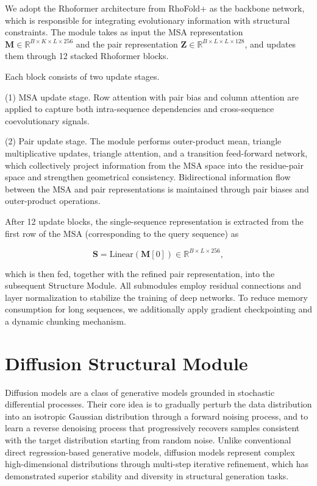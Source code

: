 We adopt the Rhoformer architecture from RhoFold+ as the backbone network\cite{Shen2024RhoFoldPlus}, which is responsible for integrating evolutionary information with structural constraints. The module takes as input the MSA representation $\mathbf{M} \in \mathbb{R}^{B \times K \times L \times 256}$ and the pair representation $\mathbf{Z} \in \mathbb{R}^{B \times L \times L \times 128}$, and updates them through 12 stacked Rhoformer blocks.

  

Each block consists of two update stages.

(1) MSA update stage. Row attention with pair bias and column attention are applied to capture both intra-sequence dependencies and cross-sequence coevolutionary signals.

(2) Pair update stage. The module performs outer-product mean, triangle multiplicative updates, triangle attention, and a transition feed-forward network, which collectively project information from the MSA space into the residue-pair space and strengthen geometrical consistency. Bidirectional information flow between the MSA and pair representations is maintained through pair biases and outer-product operations.

After 12 update blocks, the single-sequence representation is extracted from the first row of the MSA (corresponding to the query sequence) as

$$\mathbf{S} = \text{Linear}(\mathbf{M}[0]) \in \mathbb{R}^{B \times L \times 256},$$

which is then fed, together with the refined pair representation, into the subsequent Structure Module. All submodules employ residual connections and layer normalization to stabilize the training of deep networks. To reduce memory consumption for long sequences, we additionally apply gradient checkpointing and a dynamic chunking mechanism.

\section{Diffusion Structural Module}

Diffusion models are a class of generative models grounded in stochastic differential processes\cite{sohldickstein2015diffusion, ho2020ddpm}. Their core idea is to gradually perturb the data distribution into an isotropic Gaussian distribution through a forward noising process, and to learn a reverse denoising process that progressively recovers samples consistent with the target distribution starting from random noise. Unlike conventional direct regression-based generative models, diffusion models represent complex high-dimensional distributions through multi-step iterative refinement, which has demonstrated superior stability and diversity in structural generation tasks.

